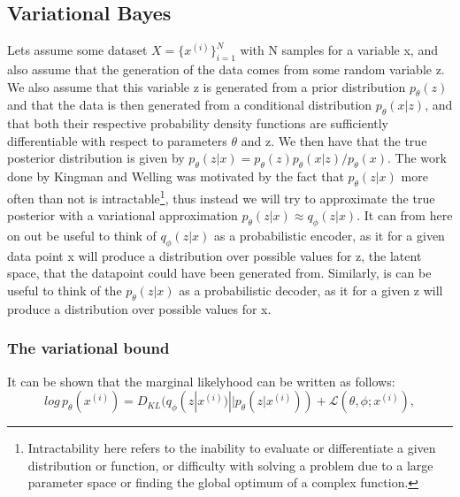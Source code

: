 \subsection*{Variational Bayes}
Lets assume some dataset $X = \{x^{(i)}\}_{i=1}^{N}$ with N samples for a variable x, and also assume that the generation of the data comes from 
some random variable z. We also assume that this variable z is generated from a prior distribution $p_{\theta}(z)$ and that the data is then 
generated from a conditional distribution $p_{\theta}(x|z)$, and that both their respective probability density functions are sufficiently 
differentiable with respect to parameters $\theta$ and z. We then have that the true posterior distribution is given by 
$p_{\theta}(z|x) = p_{\theta}(z)p_{\theta}(x|z)/p_{\theta}(x)$. The work done by Kingman and Welling \cite{VAE} was motivated by the fact that
$p_{\theta}(z|x)$ more often than not is intractable\footnote{Intractability here refers to the inability to evaluate or differentiate 
a given distribution or function, or difficulty with solving a problem due to a large parameter space or finding the global optimum of 
a complex function. }, thus instead we will try to approximate the true posterior with a variational approximation $p_{\theta}(z|x) \approx q_{\phi}(z|x)$.   
It can from here on out be useful to think of $q_{\phi}(z|x)$ as a probabilistic encoder, as it for a given data point x will produce a distribution
over possible values for z, the latent space, that the datapoint could have been generated from. Similarly, is can be useful to think of the   
$p_{\theta}(z|x)$ as a probabilistic decoder, as it for a given z will produce a distribution over possible values for x.

\subsubsection*{The variational bound}
It can be shown that the marginal likelyhood can be written as follows:
\begin{equation}
    log\, p_{\theta}(x^{(i)}) = D_{KL}(q_{\phi}(z|x^{(i)})||p_{\theta}(z|x^{(i)})) + \mathcal{L}(\theta, \phi;x^{(i)}),
\end{equation}

